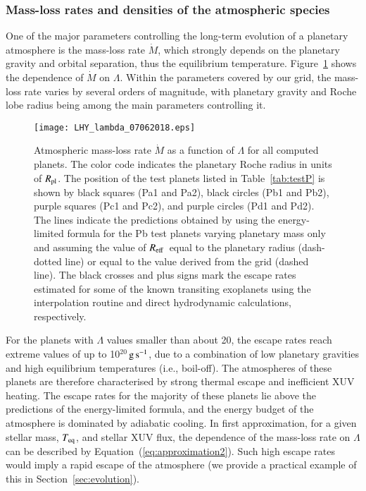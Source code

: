 \documentclass{aa}
\def\Reff{$R_{\rm eff}$}
\def\Teq{$T_{\rm eq}$}
\def\Rpl{$R_{\rm pl}$}
\def\gs{$\rm g\,s^{-1}$}
\begin{document}
\subsubsection{Mass-loss rates and densities of the atmospheric species}\label{sec:massloss}
%
One of the major parameters controlling the long-term evolution of a planetary atmosphere is the mass-loss rate $\dot{M}$, which strongly depends on the planetary gravity and orbital separation, thus the equilibrium temperature. Figure~\ref{fig:lhy-lambda} shows the dependence of $\dot{M}$ on $\Lambda$. Within the parameters covered by our grid, the mass-loss rate varies by several orders of magnitude, with planetary gravity and Roche lobe radius being among the main parameters controlling it.
\begin{figure*}
\texttt{[image: LHY\_lambda\_07062018.eps]}
\caption{Atmospheric mass-loss rate $\dot{M}$ as a function of $\Lambda$ for all computed planets. The color code indicates the planetary Roche radius in units of \Rpl. The position of the test planets listed in Table~\ref{tab:testP} is shown by black squares (Pa1 and Pa2), black circles (Pb1 and Pb2), purple squares (Pc1 and Pc2), and purple circles (Pd1 and Pd2). The lines indicate the predictions obtained by using the energy-limited formula for the Pb test planets varying planetary mass only and assuming the value of \Reff\ equal to the planetary radius (dash-dotted line) or equal to the value derived from the grid (dashed line). The black crosses and plus signs mark the escape rates estimated for some of the known transiting exoplanets using the interpolation routine and direct hydrodynamic calculations, respectively.}
\label{fig:lhy-lambda}
\end{figure*}

For the planets with $\Lambda$ values smaller than about 20, the
escape rates reach extreme values of up to 10$^{20}$\,\gs, due to
a combination of low planetary gravities and high equilibrium
temperatures (i.e., boil-off). The atmospheres of these planets
are therefore characterised by strong thermal escape and
inefficient XUV heating. The escape rates for the majority of
these planets lie above the predictions of the energy-limited
formula, and the energy {budget of the atmosphere is} dominated by
adiabatic cooling. In first approximation, for a given stellar
mass, \Teq, and stellar XUV flux, the dependence of the mass-loss
rate on $\Lambda$ can be described by
Equation~(\ref{eq:approximation2}). Such high escape rates would
imply a rapid escape of the atmosphere (we provide a practical
example of this in Section~\ref{sec:evolution}).
\end{document}
